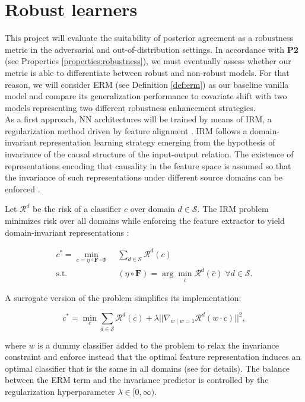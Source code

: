 \section{Robust learners}\label{sec:robust_learners}

This project will evaluate the suitability of posterior agreement as a robustness
metric in the adversarial and out-of-distribution settings. In accordance with
\textbf{P2} (see Properties \ref{properties:robustness}), we must eventually
assess whether our metric is able to differentiate between robust and non-robust
models. For that reason, we will consider ERM (see Definition \ref{def:erm}) as
our baseline vanilla model and compare its generalization performance to covariate
shift with two models representing two different robustness enhancement strategies. \\

As a first approach, NN architectures will be trained by means of IRM, a regularization method driven 
by feature alignment \cite{arjovskyInvariantRiskMinimization2020}.
IRM follows a domain-invariant representation 
learning strategy emerging from the hypothesis of invariance of the 
causal structure of the input-output relation. The existence of 
representations encoding that causality in the feature space is assumed so 
that the invariance of such representations
under different source domains can be enforced
\cite{liuOutOfDistributionGeneralizationSurvey2023}.

\begin{definition}[IRM]
    Let $\mathcal{R}^d$ be the risk of a classifier $c$
    over domain $d \in \mathcal{S}$. The IRM problem minimizes risk over all domains
    while enforcing the feature extractor to yield domain-invariant representations
    \cite{arjovskyInvariantRiskMinimization2020}:

    $$
        \begin{aligned}
            c^* = \min_{c = \eta \circ \bm{F} \circ \Phi} & \; \sum_{d \in \mathcal{S}} \mathcal{R}^d(c) \\
            \text{s.t.} & \; (\eta \circ \bm{F}) = \arg \min_{\bar{c}} \mathcal{R}^d(\bar{c}) \; \forall d \in \mathcal{S}.
        \end{aligned}
    $$

    A surrogate version of the problem simplifies its implementation:

    $$
        c^* = \min_{c} \sum_{d \in \mathcal{S}} \mathcal{R}^d(c) + \lambda || \nabla_{w \mid w = 1} \mathcal{R}^d(w \cdot c) ||^2,
    $$

    where $w$ is a dummy classifier added to the problem to relax the invariance
    constraint and enforce instead that the optimal feature representation induces
    an optimal classifier that is the same in all domains (see
    \cite{arjovskyInvariantRiskMinimization2020} for details). The balance between
    the ERM term and the invariance predictor is controlled by
    the regularization hyperparameter $\lambda \in [0, \infty)$.
\end{definition}

